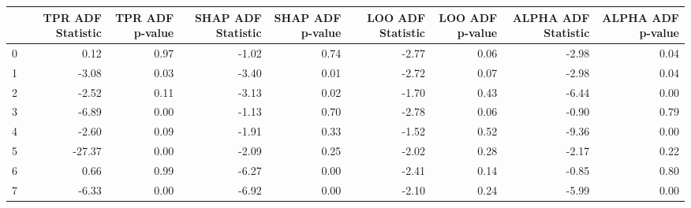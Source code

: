 \begin{tabular}{lrrrrrrrr}
\toprule
 & TPR ADF Statistic & TPR ADF p-value & SHAP ADF Statistic & SHAP ADF p-value & LOO ADF Statistic & LOO ADF p-value & ALPHA ADF Statistic & ALPHA ADF p-value \\
\midrule
0 & 0.12 & 0.97 & -1.02 & 0.74 & -2.77 & 0.06 & -2.98 & 0.04 \\
1 & -3.08 & 0.03 & -3.40 & 0.01 & -2.72 & 0.07 & -2.98 & 0.04 \\
2 & -2.52 & 0.11 & -3.13 & 0.02 & -1.70 & 0.43 & -6.44 & 0.00 \\
3 & -6.89 & 0.00 & -1.13 & 0.70 & -2.78 & 0.06 & -0.90 & 0.79 \\
4 & -2.60 & 0.09 & -1.91 & 0.33 & -1.52 & 0.52 & -9.36 & 0.00 \\
5 & -27.37 & 0.00 & -2.09 & 0.25 & -2.02 & 0.28 & -2.17 & 0.22 \\
6 & 0.66 & 0.99 & -6.27 & 0.00 & -2.41 & 0.14 & -0.85 & 0.80 \\
7 & -6.33 & 0.00 & -6.92 & 0.00 & -2.10 & 0.24 & -5.99 & 0.00 \\
\bottomrule
\end{tabular}
